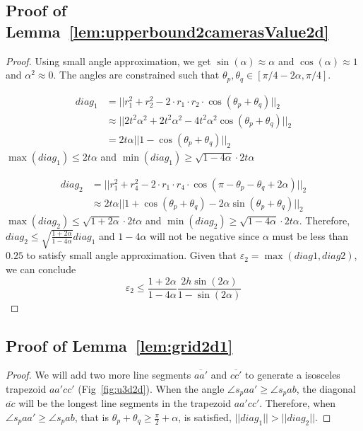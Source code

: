 \subsection{Proof of Lemma~\ref{lem:upperbound2camerasValue2d}}
\begin{proof}
Using small angle approximation, we get $\sin(\alpha) \approx \alpha$ and $\cos(\alpha)\approx 1$ and $\alpha^2 \approx 0$.
The angles are constrained such that $\theta_p, \theta_q \in [\pi/4-2\alpha, \pi/4]$.

\begin{align*}
diag_1 &= ||r_1^2+r_2^2-2\cdot r_1 \cdot r_2 \cdot \cos(\theta_p+\theta_q)||_2 \\
		&\approx ||2t^2\alpha^2 + 2t^2\alpha^2 - 4t^2\alpha^2 \cos(\theta_p+\theta_q)||_2 \\
		&= 2t\alpha||1-\cos(\theta_p+\theta_q)||_2
\end{align*}
$\max(diag_1) \leq 2t\alpha$ and $\min(diag_1) \geq \sqrt{1-4\alpha} \cdot 2t\alpha$

\begin{align*}
diag_2 &= ||r_1^2+r_4^2-2\cdot r_1 \cdot r_4 \cdot \cos(\pi - \theta_p-\theta_q + 2\alpha)||_2 \\
		&\approx 2t\alpha||1+\cos(\theta_p+\theta_q)-2\alpha\sin(\theta_p+\theta_q)||_2
\end{align*}
$\max(diag_2) \leq \sqrt{1+2\alpha} \cdot 2t\alpha$ and $\min(diag_2) \geq \sqrt{1-4\alpha} \cdot 2t\alpha$.
Therefore,$diag_2 \leq \sqrt{\frac{1+2\alpha}{1-4\alpha}} diag_1$ and $1-4\alpha$ will not be negative since $\alpha$ must be less than $0.25$ to satisfy small angle approximation.
Given that $\varepsilon_2 = \max(diag1,diag2)$, we can conclude 
$$\varepsilon_2 \leq \frac{1+2\alpha}{1-4\alpha} \frac{2h\sin(2\alpha)}{1-\sin(2\alpha)}$$
\end{proof}

\subsection{Proof of Lemma~\ref{lem:grid2d1}}
\begin{proof}
We will add two more line segments $\overline{aa'}$ and $\overline{cc'}$ to generate a isosceles trapezoid $aa'cc'$ (Fig~\ref{fig:u3d2d}). When the angle $\angle{s_paa'} \geq \angle{s_pab}$, the diagonal $\overline{ac}$ will be the longest line segments in the trapezoid $aa'cc'$. Therefore, when $\angle{s_paa'} \geq \angle{s_pab}$, that is $\theta_p + \theta_q \geq \frac{\pi}{2} + \alpha$, is satisfied, $||diag_1|| > ||diag_2||$.
\end{proof}

